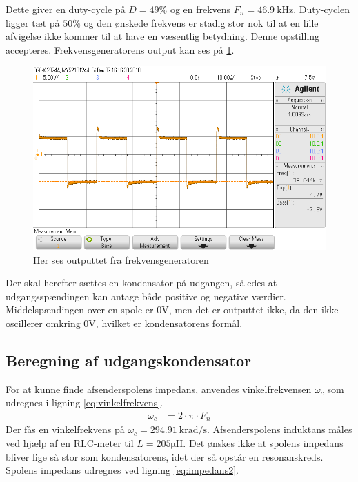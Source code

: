 Dette giver en duty-cycle på $D = 49\%$ og en frekvens $F_n = \SI{46.9}{\kilo\hertz}$. 
Duty-cyclen ligger tæt på $50\%$ og den ønskede frekvens er stadig stor nok til at en lille afvigelse ikke kommer til at have en væsentlig betydning. Denne opstilling accepteres. Frekvensgeneratorens output kan ses på \ref{fig:frekvensgenerator_output}.
\begin{figure}[h!]
	\centering
	\includegraphics[width=1\textwidth]{billeder/freq_png.png}
	\caption{Her ses outputtet fra frekvensgeneratoren}
	\label{fig:frekvensgenerator_output}
\end{figure}

Der skal herefter sættes en kondensator på udgangen, således at udgangsspændingen kan antage både positive og negative værdier. 
Middelspændingen over en spole er $0\si{\volt}$, men det er outputtet ikke, da den ikke oscillerer omkring $0 \si{\volt}$, hvilket er kondensatorens formål. 
\subsection{Beregning af udgangskondensator}
For at kunne finde afsenderspolens impedans, anvendes vinkelfrekvensen $\omega_c$ som udregnes i ligning \ref{eq:vinkelfrekvens}.
\begin{align}
	\omega_c & = 2 \cdot \pi \cdot F_n \label{eq:vinkelfrekvens}
\end{align}
Der fås en vinkelfrekvens på $\omega_c = \SI{294.91}{\kilo\radian\per\second}$.
Afsenderspolens induktans måles ved hjælp af en RLC-meter til $L = 205\si{\micro \henry}$.
Det ønskes ikke at spolens impedans bliver lige så stor som kondensatorens, idet der så opstår en resonanskreds. 
Spolens impedans udregnes ved ligning \ref{eq:impedans2}.

